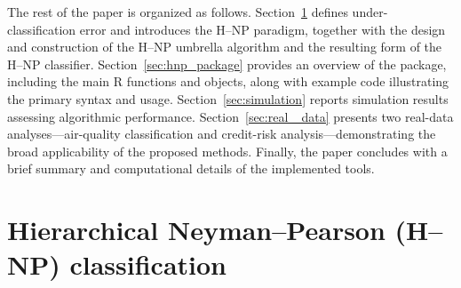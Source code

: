 The rest of the paper is organized as follows. Section~\ref{sec:hnp_classification} defines under-classification error and introduces the H--NP paradigm, together with the design and construction of the H--NP umbrella algorithm and the resulting form of the H--NP classifier.  Section~\ref{sec:hnp_package} provides an overview of the \href{https://cran.r-project.org/web/packages/HNPclassifier/index.html}{} package, including the main R functions and objects, along with example code illustrating the primary syntax and usage. Section~\ref{sec:simulation} reports simulation results assessing algorithmic performance. Section~\ref{sec:real
_data} presents two real-data analyses—air-quality classification and credit-risk analysis—demonstrating the broad applicability of the proposed methods. Finally, the paper concludes with a brief summary and computational details of the implemented tools.











\section{Hierarchical Neyman--Pearson (H--NP) classification}\label{sec:hnp_classification}


